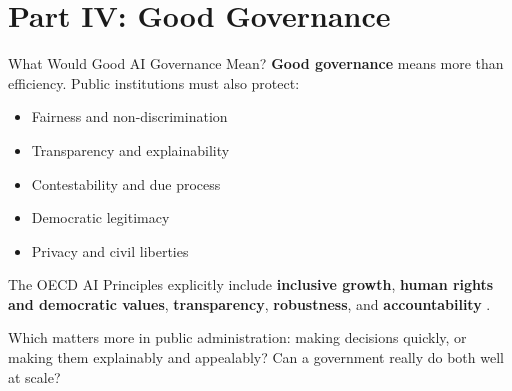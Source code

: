 \documentclass[aspectratio=169,11pt]{beamer}
\begin{document}
\section{Part IV: Good Governance}

\begin{frame}{What Would Good AI Governance Mean?}
\textbf{Good governance} means more than efficiency. Public institutions must also protect:
\begin{itemize}
    \item Fairness and non-discrimination
    \item Transparency and explainability
    \item Contestability and due process
    \item Democratic legitimacy
    \item Privacy and civil liberties
\end{itemize}

\vspace{0.2cm}
The OECD AI Principles explicitly include \textbf{inclusive growth}, \textbf{human rights and democratic values}, \textbf{transparency}, \textbf{robustness}, and \textbf{accountability} \parencite{oecd_ai_principles_2024}.

\vspace{0.2cm}
\begin{discussionbox}
\scriptsize
Which matters more in public administration: making decisions quickly, or making them explainably and appealably? Can a government really do both well at scale?
\end{discussionbox}
\end{frame}
\end{document}
